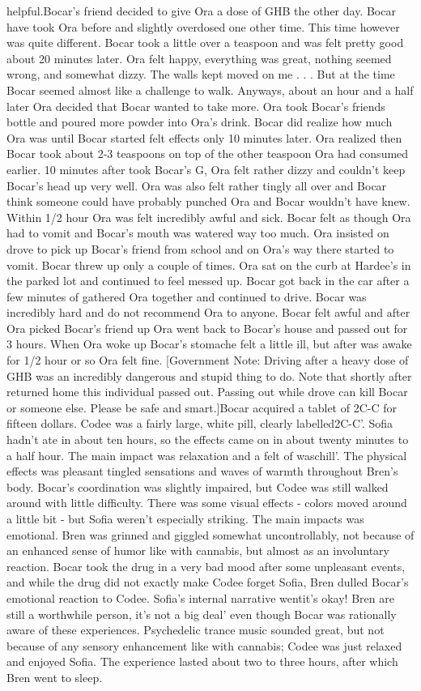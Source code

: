 \documentclass[12pt]{book}
\begin{document}
helpful.Bocar's friend decided to give Ora a dose of GHB the other day. Bocar have took Ora before and slightly overdosed one other time. This time however was quite different. Bocar took a little over a teaspoon and was felt pretty good about 20 minutes later. Ora felt happy, everything was great, nothing seemed wrong, and somewhat dizzy. The walls kept moved on me . . .  But at the time Bocar seemed almost like a challenge to walk. Anyways, about an hour and a half later Ora decided that Bocar wanted to take more. Ora took Bocar's friends bottle and poured more powder into Ora's drink. Bocar did realize how much Ora was until Bocar started felt effects only 10 minutes later. Ora realized then Bocar took about 2-3 teaspoons on top of the other teaspoon Ora had consumed earlier. 10 minutes after took Bocar's G, Ora felt rather dizzy and couldn't keep Bocar's head up very well. Ora was also felt rather tingly all over and Bocar think someone could have probably punched Ora and Bocar wouldn't have knew. Within 1/2 hour Ora was felt incredibly awful and sick. Bocar felt as though Ora had to vomit and Bocar's mouth was watered way too much. Ora insisted on drove to pick up Bocar's friend from school and on Ora's way there started to vomit. Bocar threw up only a couple of times. Ora sat on the curb at Hardee's in the parked lot and continued to feel messed up. Bocar got back in the car after a few minutes of gathered Ora together and continued to drive. Bocar was incredibly hard and do not recommend Ora to anyone. Bocar felt awful and after Ora picked Bocar's friend up Ora went back to Bocar's house and passed out for 3 hours. When Ora woke up Bocar's stomache felt a little ill, but after was awake for 1/2 hour or so Ora felt fine. [Government Note: Driving after a heavy dose of GHB was an incredibly dangerous and stupid thing to do. Note that shortly after returned home this individual passed out. Passing out while drove can kill Bocar or someone else. Please be safe and smart.]Bocar acquired a tablet of 2C-C for fifteen dollars. Codee was a fairly large, white pill, clearly labelled2C-C'. Sofia hadn't ate in about ten hours, so the effects came on in about twenty minutes to a half hour. The main impact was relaxation and a felt of waschill'. The physical effects was pleasant tingled sensations and waves of warmth throughout Bren's body. Bocar's coordination was slightly impaired, but Codee was still walked around with little difficulty. There was some visual effects - colors moved around a little bit - but Sofia weren't especially striking. The main impacts was emotional. Bren was grinned and giggled somewhat uncontrollably, not because of an enhanced sense of humor like with cannabis, but almost as an involuntary reaction. Bocar took the drug in a very bad mood after some unpleasant events, and while the drug did not exactly make Codee forget Sofia, Bren dulled Bocar's emotional reaction to Codee. Sofia's internal narrative wentit's okay! Bren are still a worthwhile person, it's not a big deal' even though Bocar was rationally aware of these experiences. Psychedelic trance music sounded great, but not because of any sensory enhancement like with cannabis; Codee was just relaxed and enjoyed Sofia. The experience lasted about two to three hours, after which Bren went to sleep. 
\end{document}

